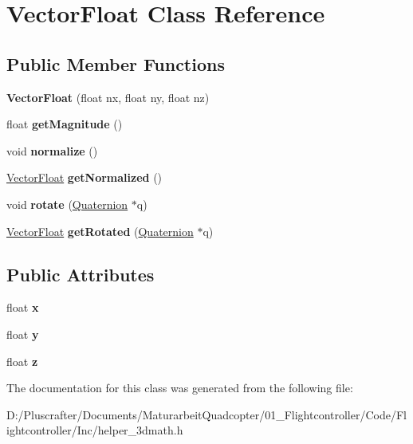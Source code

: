 \hypertarget{class_vector_float}{}\section{Vector\+Float Class Reference}
\label{class_vector_float}
\subsection*{Public Member Functions}
\begin{DoxyCompactItemize}
\item 
\mbox{\label{class_vector_float_a3b12ed03e28bded4316275882433e5aa}} 
{\bfseries Vector\+Float} (float nx, float ny, float nz)
\item 
\mbox{\label{class_vector_float_abe0c3954d8da8829a053125df1ce63d5}} 
float {\bfseries get\+Magnitude} ()
\item 
\mbox{\label{class_vector_float_a112eaf8758a6f51b96ed1ccb71700495}} 
void {\bfseries normalize} ()
\item 
\mbox{\label{class_vector_float_aacb5e7ca59563c47dd066d8b1264ec4b}} 
\mbox{\hyperlink{class_vector_float}{Vector\+Float}} {\bfseries get\+Normalized} ()
\item 
\mbox{\label{class_vector_float_afef0e6d631fb1eb67b6913e90730aa9e}} 
void {\bfseries rotate} (\mbox{\hyperlink{class_quaternion}{Quaternion}} $\ast$q)
\item 
\mbox{\label{class_vector_float_ab4093d50e98baf0d98b437a2b3ee7c2e}} 
\mbox{\hyperlink{class_vector_float}{Vector\+Float}} {\bfseries get\+Rotated} (\mbox{\hyperlink{class_quaternion}{Quaternion}} $\ast$q)
\end{DoxyCompactItemize}
\subsection*{Public Attributes}
\begin{DoxyCompactItemize}
\item 
\mbox{\label{class_vector_float_a2d8e5159f045ca977769d168af75320c}} 
float {\bfseries x}
\item 
\mbox{\label{class_vector_float_a4affe2a9de97600b3d8df98586679e14}} 
float {\bfseries y}
\item 
\mbox{\label{class_vector_float_a54b8e4234e3b48e106d090570755f107}} 
float {\bfseries z}
\end{DoxyCompactItemize}


The documentation for this class was generated from the following file\+:\begin{DoxyCompactItemize}
\item 
D\+:/\+Pluscrafter/\+Documents/\+Maturarbeit\+Quadcopter/01\+\_\+\+Flightcontroller/\+Code/\+Flightcontroller/\+Inc/helper\+\_\+3dmath.\+h\end{DoxyCompactItemize}
